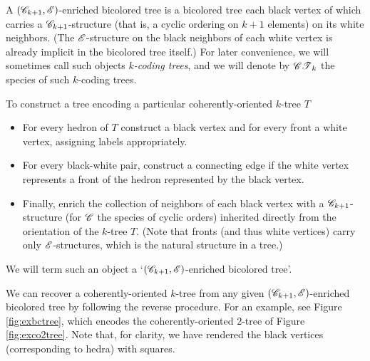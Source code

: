 \documentclass[sectionflow,singlespace,twoside,boldmathhdr]{brandiss} %
\numberwithin{section}{chapter}
\numberwithin{figure}{chapter}
\begin{document}
A $\left( {\mathscr{C}_{k+1}, \mathscr{E}} \right)$-enriched bicolored tree is a bicolored tree each black vertex of which carries a $\mathscr{C}_{k+1}$-structure (that is, a cyclic ordering on $k+1$ elements) on its white neighbors.
(The $\mathscr{E}$-structure on the black neighbors of each white vertex is already implicit in the bicolored tree itself.)
For later convenience, we will sometimes call such objects \emph{$k$-coding trees}, and we will denote by $\mathscr{CT}_{k}$ the species of such $k$-coding trees.

To construct a tree encoding a particular coherently-oriented $k$-tree $T$
\begin{itemize}
  \item For every hedron of $T$ construct a black vertex and for every front a white vertex, assigning labels appropriately.
  \item For every black-white pair, construct a connecting edge if the white vertex represents a front of the hedron represented by the black vertex.
  \item Finally, enrich the collection of neighbors of each black vertex with a $\mathscr{C}_{k+1}$-structure (for $\mathscr{C}$ the species of cyclic orders) inherited directly from the orientation of the $k$-tree $T$. (Note that fronts (and thus white vertices) carry only $\mathscr{E}$-structures, which is the natural structure in a tree.)
\end{itemize}
We will term such an object a `$\left( {\mathscr{C}_{k+1}, \mathscr{E}} \right)$-enriched bicolored tree'.

We can recover a coherently-oriented $k$-tree from any given $\left( {\mathscr{C}_{k+1}, \mathscr{E}} \right)$-enriched bicolored tree by following the reverse procedure.
For an example, see Figure \ref{fig:exbctree}, which encodes the coherently-oriented $2$-tree of Figure \ref{fig:exco2tree}.
Note that, for clarity, we have rendered the black vertices (corresponding to hedra) with squares.
\end{document}
